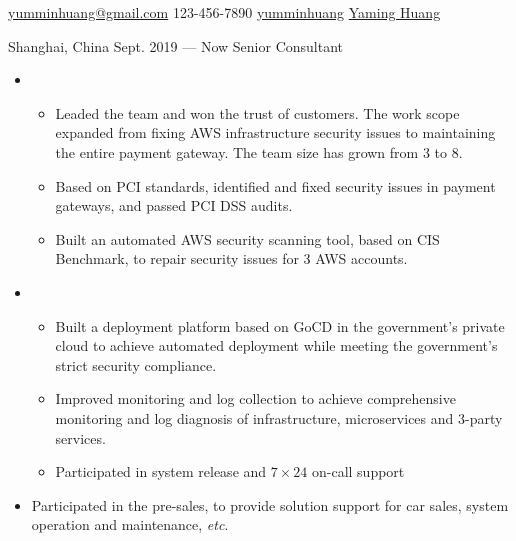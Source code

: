 \documentclass{resume}
\begin{document}
{\href{mailto:yumminhuang@gmail.com}{yumminhuang@gmail.com}}
{123-456-7890}
{\href{https://github.com/yumminhuang}{yumminhuang}}
{\href{https://www.linkedin.com/in/yaming-huang-6a09325b}{Yaming Huang}}
{}


\begin{body}
	{Shanghai, China}
	{Sept. 2019 --- Now}
	{Senior Consultant}
	\begin{itemize}[noitemsep,topsep=0pt]
		\item {}
		\begin{itemize}[noitemsep,topsep=0pt]
			\item Leaded the team and won the trust of customers. The work scope expanded from fixing AWS infrastructure security issues to maintaining the entire payment gateway. The team size has grown from 3 to 8.
			\item Based on PCI standards, identified and fixed security issues in payment gateways, and passed PCI DSS audits.
			\item Built an automated AWS security scanning tool, based on CIS Benchmark, to repair security issues for 3 AWS accounts.
		\end{itemize}
		\item {}
		\begin{itemize}[noitemsep,topsep=0pt]
			\item Built a deployment platform based on GoCD in the government's private cloud to achieve automated deployment while meeting the government's strict security compliance.
			\item Improved monitoring and log collection to achieve comprehensive monitoring and log diagnosis of infrastructure, microservices and 3-party services.
			\item Participated in system release and $7\times 24$ on-call support
		\end{itemize}
		\item Participated in the pre-sales, to provide solution support for car sales, system operation and maintenance, \textit{etc}.
	\end{itemize}

\end{body}
\end{document}
